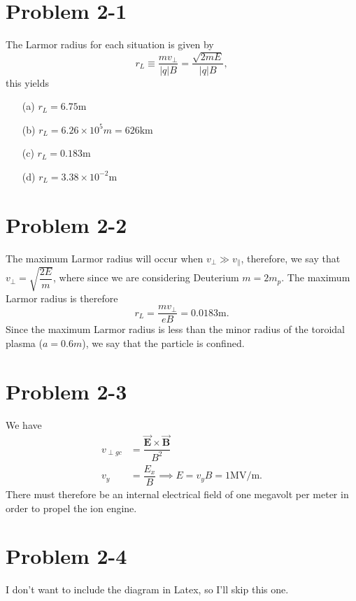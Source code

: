 \section*{Problem 2-1}
\label{sec:2-1}
The Larmor radius for each situation is given by 
\begin{equation}
	r_L \equiv \dfrac{mv_\perp}{|q|B} = \dfrac{\sqrt{2mE}}{|q|B},
\end{equation}
this yields
\begin{itemize}
	\item[(a)] \(r_L = 6.75\text{m} \)
	\item[(b)] \(r_L = 6.26\times10^{5}m = 626\text{km}\)
	\item[(c)] \(r_L = 0.183\text{m} \)
	\item[(d)] \(r_L = 3.38\times10^{-2}\text{m} \)
\end{itemize}

\section*{Problem 2-2}
\label{sec:2-2}
The maximum Larmor radius will occur when \(v_\perp \gg v_\parallel \), therefore, we say that \(v_\perp = \sqrt{\dfrac{2E}{m}} \), where since we are considering Deuterium \(m = 2m_p\). The maximum Larmor radius is therefore
\begin{equation}
	r_L = \dfrac{mv_\perp}{eB} = 0.0183\text{m}.
\end{equation} 
Since the maximum Larmor radius is less than the minor radius of the toroidal plasma (\(a = 0.6m\)), we say that the particle is confined.

\section*{Problem 2-3}
\label{sec:2-3}
We have
\begin{align}
	v_{\perp gc} &= \dfrac{\vec{\textbf{E}}\times\vec{\textbf{B}}}{B^2} \\ 
	v_y &= \dfrac{E_x}{B} \implies
	E = v_yB = 1\text{MV/m}.
\end{align}
There must therefore be an internal electrical field of one megavolt per meter in order to propel the ion engine. 

\section*{Problem 2-4}
\label{sec:2-4}
I don't want to include the diagram in Latex, so I'll skip this one. 

